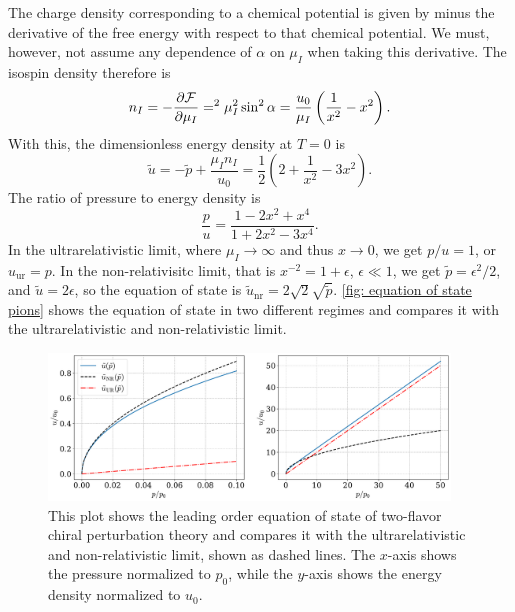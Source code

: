 %
The charge density corresponding to a chemical potential is given by minus the derivative of the free energy with respect to that chemical potential. 
We must, however, not assume any dependence of $\alpha$ on $\mu_I$ when taking this derivative.
The isospin density therefore is
%
\begin{equation}
    n_I = -\pdv{\mathcal{F}}{\mu_I} = ^2 \mu_I^2 \sin^2 \alpha 
    = 
    \frac{u_0}{\mu_I} \left(\frac{1}{x^2} - x^2\right).
\end{equation}
%
With this, the dimensionless energy density at $T = 0$ is
%
\begin{equation}
    \label{energy density leading order chpt}
    \tilde u = - \tilde p + \frac{\mu_I n_I}{u_0}
    = \frac{1}{2} \left( 2 + \frac{1}{x^2} - 3 x^2\right).
\end{equation}
% 
The ratio of pressure to energy density is
%
\begin{equation} 
    \label{pressure energy ratio leading order chpt}
    \frac{p}{u} = \frac{1- 2x^2 + x^4  }{1 + 2x^2 -3x^4 }.
\end{equation}
%
In the ultrarelativistic limit, where $\mu_I \rightarrow \infty$ and thus $x \rightarrow 0$, we get $p / u = 1$, or $u_\text{ur} = p$.
In the non-relativisitc limit, that is $x^{-2} = 1 + \epsilon$, $\epsilon \ll 1$, we get $\tilde p = \epsilon^2 / 2 $, and $\tilde u = 2\epsilon$, so the equation of state is $\tilde u_\text{nr} = 2 \sqrt 2 \sqrt{\tilde p}$.
\autoref{fig: equation of state pions} shows the equation of state in two different regimes and compares it with the ultrarelativistic and non-relativistic limit.

\begin{figure}[h]
    \centering
    \includegraphics[width=0.95\textwidth]{../scripts/figurer/pion_star/pion_eos.pdf}
    \caption{
        This plot shows the leading order equation of state of two-flavor chiral perturbation theory and compares it with the ultrarelativistic and non-relativistic limit, shown as dashed lines. The $x$-axis shows the pressure normalized to $p_0$, while the $y$-axis shows the energy density normalized to $u_0$.
    }
    \label{fig: equation of state pions}
\end{figure}


